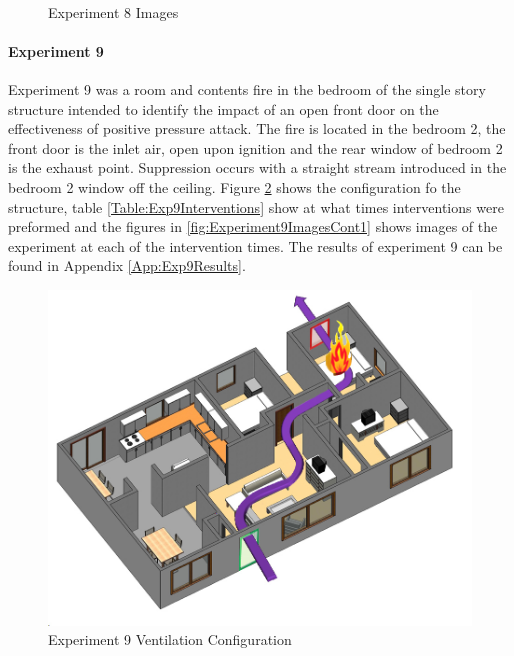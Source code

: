 \documentclass{article}
\begin{document}
\begin{figure}[H]
	\ContinuedFloat 
	\centering 
	 \ 
	\caption{Experiment 8 Images}
	\label{fig:Experiment8ImagesCont3} 
\end{figure}

\paragraph{Experiment 9}\mbox{}

Experiment 9 was a room and contents fire in the bedroom of the single story structure intended to identify the impact of an open front door on the effectiveness of positive pressure attack. The fire is located in the bedroom 2, the front door is the inlet air, open upon ignition and the rear window of bedroom 2 is the exhaust point. Suppression occurs with a straight stream introduced in the bedroom 2 window off the ceiling. Figure \ref{fig:Exp9VentConfig} shows the configuration fo the structure, table \ref{Table:Exp9Interventions} show at what times interventions were preformed and the figures in \ref{fig:Experiment9ImagesCont1} shows images of the experiment at each of the intervention times. The results of experiment 9 can be found in Appendix \ref{App:Exp9Results}.

\begin{figure}[h!]
	\centering
	\includegraphics[width=5in]{0_Images/FireExperiments/Single_Story/Experiment_9.jpg}
	\caption{Experiment 9 Ventilation Configuration}
	\label{fig:Exp9VentConfig}
\end{figure}
\end{document}
